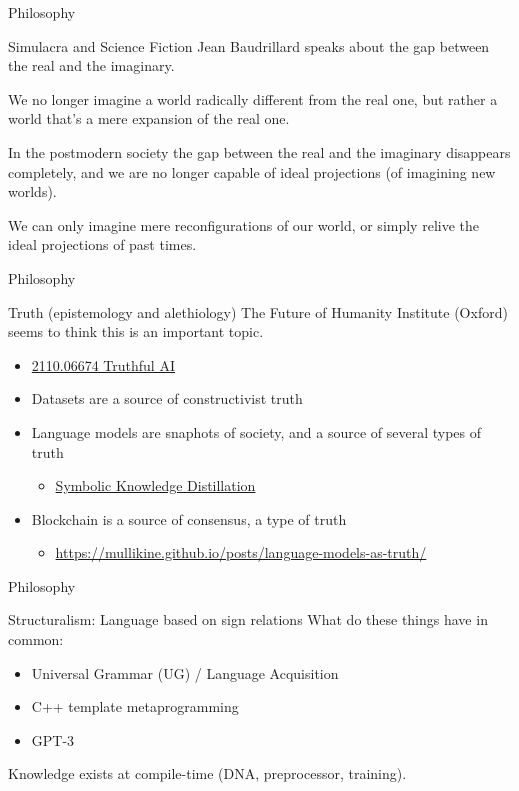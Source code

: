 \documentclass[presentation]{beamer}
\begin{document}
\begin{frame}[label={sec:org58b258b}]{Philosophy}
\begin{block}{Simulacra and Science Fiction}
Jean Baudrillard speaks about the gap
between the real and the imaginary.

We no longer imagine a world radically
different from the real one, but
rather a world that's a mere expansion
of the real one.

In the postmodern society the gap
between the real and the imaginary
disappears completely, and we are no
longer capable of ideal projections
(of imagining new worlds).

We can only imagine mere
reconfigurations of our world, or
simply relive the ideal projections of
past times.
\end{block}
\end{frame}

\begin{frame}[label={sec:orgb5b492d}]{Philosophy}
\begin{block}{Truth (epistemology and alethiology)}
The Future of Humanity Institute (Oxford)
seems to think this is an important topic.

\begin{itemize}
\item \href{https://arxiv.org/abs/2110.06674}{ 2110.06674  Truthful AI}
\item Datasets are a source of constructivist truth
\item Language models are snaphots of society, and a source of several types of truth
\begin{itemize}
\item \href{https://www.youtube.com/watch?v=kP-dXK9JEhY}{Symbolic Knowledge Distillation}
\end{itemize}
\item Blockchain is a source of consensus, a type of truth
\begin{itemize}
\item \url{https://mullikine.github.io/posts/language-models-as-truth/}
\end{itemize}
\end{itemize}
\end{block}
\end{frame}

\begin{frame}[label={sec:orgfa103dc}]{Philosophy}
\begin{block}{Structuralism: Language based on sign relations}
What do these things have in common:
\begin{itemize}
\item Universal Grammar (UG) / Language Acquisition
\item C++ template metaprogramming
\item GPT-3
\end{itemize}

Knowledge exists at compile-time (DNA, preprocessor, training).
\end{block}
\end{frame}
\end{document}
